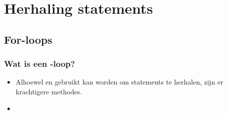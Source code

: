 \section{Herhaling statements}
\subsection{For-loops}



\begin{frame}
\frametitle{Wat is een -loop?}

\begin{itemize}
  \item<1-> Alhoewel  en  gebruikt kan worden om statements te herhalen,
  	zijn er krachtigere methodes.
  \item<2-> 
\end{itemize}


\end{frame}




